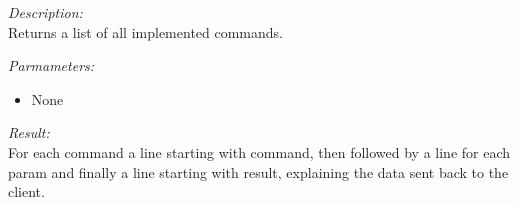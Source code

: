 \begin{description}
\item {\it Description:}\\
Returns a list of all implemented commands.
\item {\it Parmameters:}
\begin{itemize}
\item None
\end{itemize}
\item {\it Result:}\\
For each command a line starting with command, then followed by a line for each param and finally a line starting with result, explaining the data sent back to the client.
\end{description}

